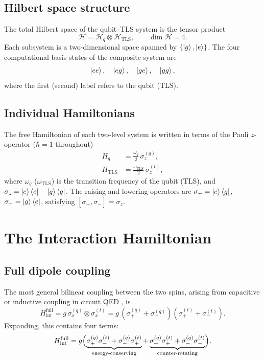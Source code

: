 \documentclass[12pt,a4paper]{article}
\newcommand{\Hil}{\mathcal{H}}
\newcommand{\wq}{\omega_q}
\newcommand{\wt}{\omega_{\mathrm{TLS}}}
\newcommand{\smq}{\sigma_-^{(q)}}
\newcommand{\spq}{\sigma_+^{(q)}}
\newcommand{\smt}{\sigma_-^{(t)}}
\newcommand{\spt}{\sigma_+^{(t)}}
\newcommand{\szq}{\sigma_z^{(q)}}
\newcommand{\szt}{\sigma_z^{(t)}}
\begin{document}
\subsection{Hilbert space structure}

The total Hilbert space of the qubit--TLS system is the tensor product
\begin{equation}
  \Hil = \Hil_q \otimes \Hil_{\mathrm{TLS}},
  \qquad
  \dim \Hil = 4.
\end{equation}
Each subsystem is a two-dimensional space spanned by
$\{\ket{g},\ket{e}\}$. The four computational basis states of the
composite system are
\begin{equation}
  \ket{ee},\quad \ket{eg},\quad \ket{ge},\quad \ket{gg},
\end{equation}
where the first (second) label refers to the qubit (TLS).

\subsection{Individual Hamiltonians}

The free Hamiltonian of each two-level system is written in terms of the
Pauli $z$-operator ($\hbar = 1$ throughout)
\begin{align}
  H_q    &= \frac{\wq}{2}\,\szq, \label{eq:Hq}\\[4pt]
  H_{\mathrm{TLS}} &= \frac{\wt}{2}\,\szt, \label{eq:Ht}
\end{align}
where $\wq$ ($\wt$) is the transition frequency of the qubit (TLS), and
$\sigma_z = \ket{e}\bra{e} - \ket{g}\bra{g}$.
The raising and lowering operators are
$\sigma_+ = \ket{e}\bra{g}$, $\sigma_- = \ket{g}\bra{e}$,
satisfying $[\sigma_+,\sigma_-] = \sigma_z$.

\section{The Interaction Hamiltonian}

\subsection{Full dipole coupling}

The most general bilinear coupling between the two spins, arising from
capacitive or inductive coupling in circuit QED \cite{Blais2021}, is
\begin{equation}
  H_{\mathrm{int}}^{\mathrm{full}}
  = g\,\sigma_x^{(q)} \otimes \sigma_x^{(t)}
  = g\,(\spq + \smq)(\spt + \smt).
\end{equation}
Expanding, this contains four terms:
\begin{equation}
  H_{\mathrm{int}}^{\mathrm{full}}
  = g\Bigl(
      \underbrace{\spq\smt + \smq\spt}_{\text{energy-conserving}}
    + \underbrace{\spq\spt + \smq\smt}_{\text{counter-rotating}}
    \Bigr).
  \label{eq:Hint_full}
\end{equation}
\end{document}
